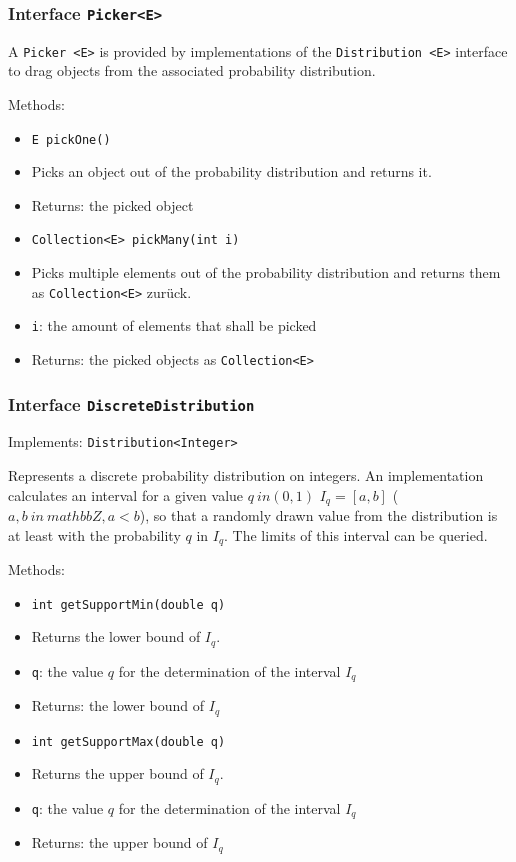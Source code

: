 \documentclass[parskip=full,11pt]{scrartcl}
\begin{document}
\subsubsection{Interface \texttt{Picker<E>}}
A \texttt{Picker <E>} is provided by implementations of the \texttt{Distribution <E>} interface to drag objects from the associated probability distribution.

Methods:
\begin{itemize}\itemsep -10pt
\item \texttt{E pickOne()}
\item[] Picks an object out of the probability distribution and returns it.
\item[] Returns: the picked object

\item \texttt{Collection<E> pickMany(int i)}
\item[] Picks multiple elements out of the probability distribution and returns them as \texttt{Collection<E>} zurück.
\item[] \texttt{i}: the amount of elements that shall be picked
\item[] Returns: the picked objects as \texttt{Collection<E>}
\end{itemize}

\subsubsection{Interface \texttt{DiscreteDistribution}}
Implements: \texttt{Distribution<Integer>}

Represents a discrete probability distribution on integers. An implementation calculates an interval for a given value \(q \ in (0,1) \) \(I_q = [a, b] \) (\(a, b \ in \ mathbb {Z}, a < b \)), so that a randomly drawn value from the distribution is at least with the probability \(q \) in \(I_q \). The limits of this interval can be queried.

Methods:
\begin{itemize}\itemsep -10pt
\item \texttt{int getSupportMin(double q)}
\item[] Returns the lower bound of \(I_q\).
\item[] \texttt{q}: the value \(q\) for the determination of the interval \(I_q\)
\item[] Returns: the lower bound of \(I_q\)

\item \texttt{int getSupportMax(double q)}
\item[] Returns the upper bound of \(I_q\).
\item[] \texttt{q}: the value \(q\) for the determination of the interval \(I_q\)
\item[] Returns: the upper bound of \(I_q\)
\end{itemize}
\end{document}
